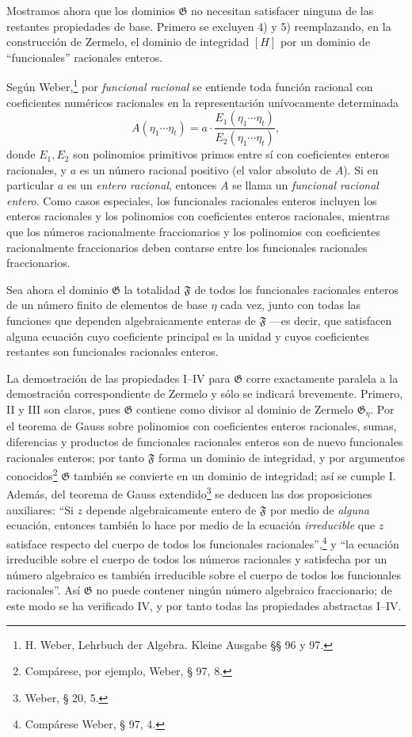 \documentclass[11pt]{article}
\begin{document}
Mostramos ahora que los dominios $\mathfrak G$ no necesitan satisfacer ninguna de las restantes propiedades de base. Primero se excluyen 4) y 5) reemplazando, en la construcción de Zermelo, el dominio de integridad $[H]$ por un dominio de ``funcionales'' racionales enteros.

Según Weber,\footnote{H. Weber, Lehrbuch der Algebra. Kleine Ausgabe §§ 96 y 97.} por \emph{funcional racional} se entiende toda función racional con coeficientes numéricos racionales en la representación unívocamente determinada
\[
 A(\eta_1\cdots \eta_t)
   = a\cdot\frac{E_1(\eta_1\cdots \eta_t)}{E_2(\eta_1\cdots \eta_t)},
\]
donde $E_1,E_2$ son polinomios primitivos primos entre sí con coeficientes enteros racionales, y $a$ es un número racional positivo (el valor absoluto de $A$). Si en particular $a$ es un \emph{entero racional}, entonces $A$ se llama un \emph{funcional racional entero}. Como casos especiales, los funcionales racionales enteros incluyen los enteros racionales y los polinomios con coeficientes enteros racionales, mientras que los números racionalmente fraccionarios y los polinomios con coeficientes racionalmente fraccionarios deben contarse entre los funcionales racionales fraccionarios.

Sea ahora el dominio $\mathfrak G$ la totalidad $\mathfrak F$ de todos los funcionales racionales enteros de un número finito de elementos de base $\eta$ cada vez, junto con todas las funciones que dependen algebraicamente enteras de $\mathfrak F$ ---es decir, que satisfacen alguna ecuación cuyo coeficiente principal es la unidad y cuyos coeficientes restantes son funcionales racionales enteros.

La demostración de las propiedades I--IV para $\mathfrak G$ corre exactamente paralela a la demostración correspondiente de Zermelo y sólo se indicará brevemente. Primero, II y III son claros, pues $\mathfrak G$ contiene como divisor al dominio de Zermelo $\mathfrak G_\eta$. Por el teorema de Gauss sobre polinomios con coeficientes enteros racionales, sumas, diferencias y productos de funcionales racionales enteros son de nuevo funcionales racionales enteros; por tanto $\mathfrak F$ forma un dominio de integridad, y por argumentos conocidos\footnote{Compárese, por ejemplo, Weber, § 97, 8.} $\mathfrak G$ también se convierte en un dominio de integridad; así se cumple I. Además, del teorema de Gauss extendido\footnote{Weber, § 20, 5.} se deducen las dos proposiciones auxiliares: ``Si $z$ depende algebraicamente entero de $\mathfrak F$ por medio de \emph{alguna} ecuación, entonces también lo hace por medio de la ecuación \emph{irreducible} que $z$ satisface respecto del cuerpo de todos los funcionales racionales'',\footnote{Compárese Weber, § 97, 4.} y ``la ecuación irreducible sobre el cuerpo de todos los números racionales y satisfecha por un número algebraico es también irreducible sobre el cuerpo de todos los funcionales racionales''. Así $\mathfrak G$ no puede contener ningún número algebraico fraccionario; de este modo se ha verificado IV, y por tanto todas las propiedades abstractas I--IV.
\end{document}
